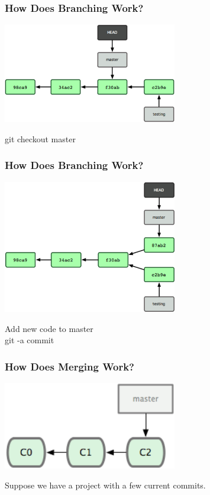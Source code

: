 \begin{frame}
\frametitle{\large How Does Branching Work?}
\begin{center}
\includegraphics[width=0.57\textwidth]{img/branching_images/fig8.png}
\end{center}
\vspace{2mm}
\begin{center}
git checkout master
\end{center}
\end{frame}
\note{}

\begin{frame}
\frametitle{\large How Does Branching Work?}
\begin{center}
\includegraphics[width=0.57\textwidth]{img/branching_images/fig9.png}
\end{center}
\vspace{2mm}
\begin{center}
\small Add new code to master\\
\small git -a commit
\end{center}
\end{frame}
\note{}

\begin{frame}
\frametitle{\large How Does Merging Work?}
\begin{center}
\includegraphics[width=0.57\textwidth]{img/branching_images/f1.png}
\end{center}
\vspace{2mm}
\begin{center}
Suppose we have a project with a few current commits.
\end{center}
\end{frame}
\note{}

